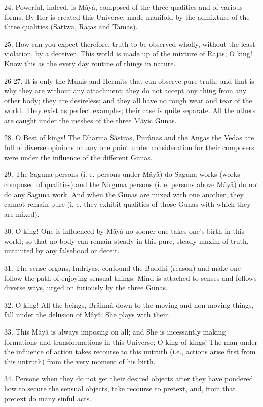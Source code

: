 24. Powerful, indeed, is M\^ay\^a, composed of the three qualities and of various forms. By Her is created this Universe, made manifold by the admixture of the three qualities (Sattwa, Rajas and Tamas).

25. How can you expect therefore, truth to be observed wholly, without the least violation, by a deceiver. This world is made up of the mixture of Rajas; O king! Know this as the every day routine of things in nature.

26-27. It is only the Munis and Hermits that can observe pure truth; and that is why they are without any attachment; they do not accept any thing from any other body; they are desireless; and they all have no rough wear and tear of the world. They exist as perfect examples; their case is quite separate. All the others are caught under the meshes of the three M\^ayic Gunas.

28. O Best of kings! The Dharma \'S\^astras, Pur\^anas and the Angas the Vedas are full of diverse opinions on any one point under consideration for their composers were under the influence of the different Gunas.

29. The Saguna persons (i. e. persons under M\^ay\^a) do Saguna works (works composed of qualities) and the Nirguna persons (i. e. persons above M\^ay\^a) do not do any Saguna work. And when the Gunas are mixed with one another, they cannot remain pure (i. e. they exhibit qualities of those Gunas with which they are mixed).

30. O king! One is influenced by M\^ay\^a no sooner one takes one's birth in this world; so that no body can remain steady in this pure, steady maxim of truth, untainted by any falsehood or deceit.

31. The sense organs, Indriyas, confound the Buddhi (reason) and make one follow the path of enjoying sensual things. Mind is attached to senses and follows diverse ways, urged on furiously by the three Gunas.

32. O king! All the beings, Br\^ahm\^a down to the moving and non-moving things, fall under the delusion of M\^ay\^a; She plays with them.

33. This M\^ay\^a is always imposing on all; and She is incessantly making formations and transformations in this Universe; O king of kings! The man under the influence of action takes recourse to this untruth (i.e., actions arise first from this untruth) from the very moment of his birth.

34. Persons when they do not get their desired objects after they have pondered how to secure the sensual objects, take recourse to pretext, and, from that pretext do many sinful acts.

